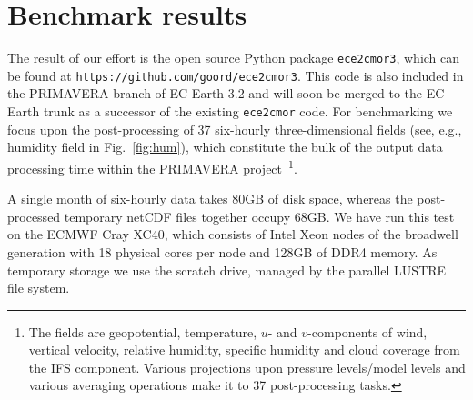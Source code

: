 \documentclass[procedia]{easychair}
\begin{document}
\section{Benchmark results}
The result of our effort is the open source Python package \texttt{ece2cmor3}, 
which can be found at \texttt{https://github.com/goord/ece2cmor3}. This code is 
also included in the PRIMAVERA branch of EC-Earth 3.2 and will soon be merged 
to the EC-Earth trunk as a successor of the existing \texttt{ece2cmor} code. 
For benchmarking we focus upon the post-processing of 37 six-hourly 
three-dimensional fields (see, e.g., humidity field in Fig.~\ref{fig:hum}), 
which constitute the bulk of the output data 
processing time within the PRIMAVERA project~\footnote{The fields are 
geopotential, temperature, $u$- and $v$-components of wind, vertical velocity, 
relative humidity, specific humidity and cloud coverage from the IFS 
component. Various projections upon pressure levels/model levels and 
various averaging operations make it to 37 post-processing tasks.}.
  
A single month of six-hourly data takes 80GB of disk space, whereas the 
post-processed temporary netCDF files together occupy 68GB. We have run this 
test on the ECMWF Cray XC40, which consists of Intel Xeon nodes of the 
broadwell generation with 18 physical cores per node and 128GB of DDR4 memory. 
As temporary storage we use the scratch drive, managed by the parallel LUSTRE 
file system.
\end{document}
